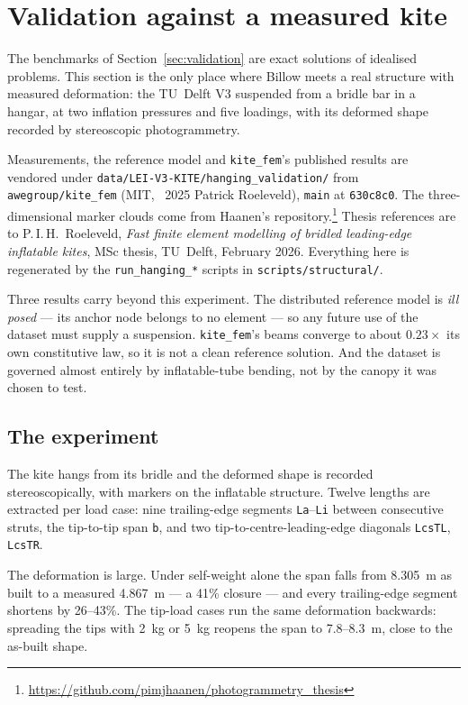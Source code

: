 \documentclass[11pt,a4paper]{article}
\newcommand{\code}[1]{\texttt{\small #1}}
\begin{document}
\section{Validation against a measured kite}
\label{sec:hanging}

The benchmarks of Section~\ref{sec:validation} are exact solutions of idealised
problems. This section is the only place where Billow meets a real structure
with measured deformation: the TU~Delft V3 suspended from a bridle bar in a
hangar, at two inflation pressures and five loadings, with its deformed shape
recorded by stereoscopic photogrammetry.

Measurements, the reference model and \code{kite\_fem}'s published results are
vendored under \code{data/LEI-V3-KITE/hanging\_validation/} from
\code{awegroup/kite\_fem} (MIT, \textcopyright~2025 Patrick Roeleveld),
\code{main} at \code{630c8c0}. The three-dimensional marker clouds come from
Haanen's repository.\footnote{%
\url{https://github.com/pimjhaanen/photogrammetry_thesis}}
Thesis references are to P.\,I.\,H.~Roeleveld, \emph{Fast finite element
modelling of bridled leading-edge inflatable kites}, MSc thesis, TU~Delft,
February 2026. Everything here is regenerated by the \code{run\_hanging\_*}
scripts in \code{scripts/structural/}.

Three results carry beyond this experiment. The distributed reference model is
\emph{ill posed} --- its anchor node belongs to no element --- so any future use
of the dataset must supply a suspension. \code{kite\_fem}'s beams converge to
about $0.23\times$ its own constitutive law, so it is not a clean reference
solution. And the dataset is governed almost entirely by inflatable-tube
bending, not by the canopy it was chosen to test.

\subsection{The experiment}

The kite hangs from its bridle and the deformed shape is recorded
stereoscopically, with markers on the inflatable structure. Twelve lengths are
extracted per load case: nine trailing-edge segments \texttt{La}--\texttt{Li}
between consecutive struts, the tip-to-tip span \texttt{b}, and two
tip-to-centre-leading-edge diagonals \texttt{LcsTL}, \texttt{LcsTR}.

The deformation is large. Under self-weight alone the span falls from
\SI{8.305}{m} as built to a measured \SI{4.867}{m} --- a 41\% closure --- and
every trailing-edge segment shortens by 26--43\%. The tip-load cases run the
same deformation backwards: spreading the tips with \SI{2}{kg} or \SI{5}{kg}
reopens the span to \SI{7.8}{}--\SI{8.3}{m}, close to the as-built shape.
\end{document}
